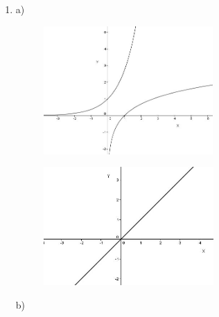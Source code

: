 \documentclass[12pt]{article}
\begin{document}
\vspace{\baselineskip}
\begin{enumerate}
	\item a)\par




\begin{figure}[H]
	\begin{Center}
		\includegraphics[width=2.54in,height=1.93in]{./media/image23.JPG}
	\end{Center}
\end{figure}



\par




\begin{figure}[H]
	\begin{Center}
		\includegraphics[width=2.55in,height=1.78in]{./media/image24.JPG}
	\end{Center}
\end{figure}



b)\par




\end{enumerate}
\end{document}
